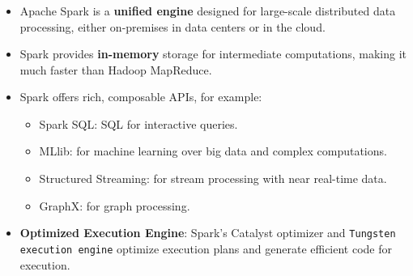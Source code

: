 \begin{frame}
    \frametitle{\subsecname}
    \begin{itemize}
        \item Apache Spark is a \textbf{unified engine} designed for large-scale distributed data processing, either on-premises in data centers or in the cloud.
        \item Spark provides \textbf{in-memory} storage for intermediate computations, making it much faster than Hadoop MapReduce.
        \item Spark offers rich, composable APIs, for example:
        \begin{itemize}
            \item Spark SQL: SQL for interactive queries.
            \item MLlib: for machine learning over big data and complex computations.
            \item Structured Streaming: for stream processing with near real-time data.
            \item GraphX: for graph processing.
        \end{itemize}
        \item \textbf{Optimized Execution Engine}: Spark's Catalyst optimizer and \texttt{Tungsten execution engine} optimize execution plans and generate efficient code for execution.
    \end{itemize}
\end{frame}

